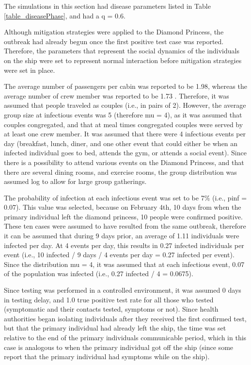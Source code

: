 \documentclass[sr]{drdc-report}
\begin{document}
The simulations in this section had disease parameters listed in Table \ref{table_diseasePhase}, and had a q = 0.6. 

Although mitigation strategies were applied to the Diamond Princess, the outbreak had already begun once the first positive test case was reported. Therefore, the parameters that represent the social dynamics of the individuals on the ship were set to represent normal interaction before mitigation strategies were set in place. 

The average number of passengers per cabin was reported to be 1.98, whereas the average number of crew member was reported to be 1.73 \cite{10..15585/mmwr..mm6912e3}.  Therefore, it was assumed that people traveled as couples (i.e., in pairs of 2). However, the average group size at infectious events was 5 (therefore mu = 4), as it was assumed that couples congregated, and that at meal times congregated couples were served by at least one crew member. It was assumed that there were 4 infectious events per day (breakfast, lunch, diner, and one other event that could either be when an infected individual goes to bed, attends the gym, or attends a social event). Since there is a possibility to attend various events on the Diamond Princess, and that there are several dining rooms, and exercise rooms, the group distribution was assumed log to allow for large group gatherings. 

The probability of infection at each infectious event was set to be 7\% (i.e., pinf = 0.07). This value was selected, because on February 4th, 10 days from when the primary individual left the diamond princess, 10 people were confirmed positive. These ten cases were assumed to have resulted from the same outbreak, therefore it can be assumed that during 9 days prior, an average of 1.11 individuals were infected per day. At 4 events per day, this results in 0.27 infected individuals per event (i.e., 10 infected / 9 days / 4 events per day = 0.27 infected per event). Since the distribution mu = 4, it was assumed that at each infectious event, 0.07 of the population was infected (i.e., 0.27 infected / 4  = 0.0675).

Since testing was performed in a controlled environment, it was assumed 0 days in testing delay, and 1.0 true positive test rate for all those who tested (symptomatic and their contacts tested, symptoms or not). Since health authorities began isolating individuals after they received the first confirmed test, but that the primary individual had already left the ship, the time was set relative to the end of the primary individuals communicable period, which in this case is analogous to when the primary individual got off the ship (since some report that the primary individual had symptoms while on the ship). 
\end{document}
